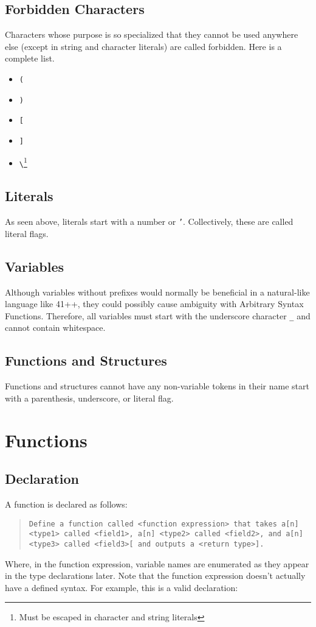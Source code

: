 \documentclass{article}
\newcommand{\code}[1]{\texttt{#1}}
\newcommand{\codeblock}[1]{\begin{quote}\code{#1}\end{quote}}
\begin{document}
\subsection{Forbidden Characters}
Characters whose purpose is so specialized that they cannot be used anywhere else (except in string and character literals) are called forbidden. Here is a complete list.
\begin{itemize}
\item \code{(}
\item \code{)}
\item \code{[}
\item \code{]}
\item \code{\textbackslash}\footnote{Must be escaped in character and string literals}
\end{itemize}
\subsection{Literals}
As seen above, literals start with a number or \code{'}. Collectively, these are called literal flags.
\subsection{Variables}
Although variables without prefixes would normally be beneficial in a natural-like language like 41++, they could possibly cause ambiguity with Arbitrary Syntax Functions. Therefore, all variables must start with the underscore character \code{\_} and cannot contain whitespace.
\subsection{Functions and Structures}
Functions and structures cannot have any non-variable tokens in their name start with a parenthesis, underscore, or literal flag.
\section{Functions}
\subsection{Declaration}
A function is declared as follows:

\codeblock{Define a function called <function expression> that takes a[n] <type1> called <field1>, a[n] <type2> called <field2>, and a[n] <type3> called <field3>[ and outputs a <return type>].}

Where, in the function expression, variable names are enumerated as they appear in the type declarations later. Note that the function expression doesn't actually have a defined syntax. For example, this is a valid declaration:
\end{document}
